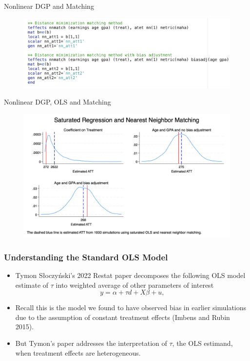 \documentclass{beamer}
\begin{document}
\begin{frame}{Nonlinear DGP and Matching}

\begin{figure}[!t]\centering
\includegraphics[scale=0.325]{./lecture_includes/nonlinear_matching}
\end{figure}

\end{frame}

\begin{frame}{Nonlinear DGP, OLS and Matching}

\begin{figure}[!t]\centering
\includegraphics[scale=0.175]{./lecture_includes/nonlinear_att.jpg}
\end{figure}

\end{frame}





\begin{frame}\frametitle{Understanding the Standard OLS Model}
\begin{itemize}
  \item Tymon S{\l}oczy\'nski's 2022 Restat paper decomposes the following OLS model estimate of $\tau$ into weighted average of other parameters of interest
    \begin{equation}
      y = \alpha + \tau d + X \beta + u,
    \end{equation}
  \item Recall this is the model we found to have observed bias in earlier simulations due to the assumption of constant treatment effects (Imbens and Rubin 2015).
  \item But Tymon's paper addresses the interpretation of \(\tau\), the OLS estimand, when treatment effects are heterogeneous.
\end{itemize}
\end{frame}
\end{document}
